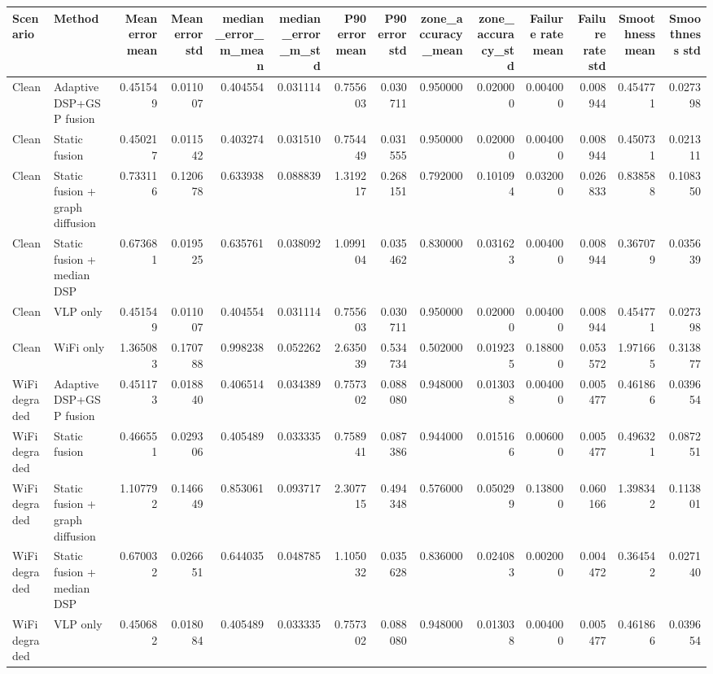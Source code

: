 \begin{tabular}{llrrrrrrrrrrrr}
\toprule
Scenario & Method & Mean error mean & Mean error std & median_error_m_mean & median_error_m_std & P90 error mean & P90 error std & zone_accuracy_mean & zone_accuracy_std & Failure rate mean & Failure rate std & Smoothness mean & Smoothness std \\
\midrule
Clean & Adaptive DSP+GSP fusion & 0.451549 & 0.011007 & 0.404554 & 0.031114 & 0.755603 & 0.030711 & 0.950000 & 0.020000 & 0.004000 & 0.008944 & 0.454771 & 0.027398 \\
Clean & Static fusion & 0.450217 & 0.011542 & 0.403274 & 0.031510 & 0.754449 & 0.031555 & 0.950000 & 0.020000 & 0.004000 & 0.008944 & 0.450731 & 0.021311 \\
Clean & Static fusion + graph diffusion & 0.733116 & 0.120678 & 0.633938 & 0.088839 & 1.319217 & 0.268151 & 0.792000 & 0.101094 & 0.032000 & 0.026833 & 0.838588 & 0.108350 \\
Clean & Static fusion + median DSP & 0.673681 & 0.019525 & 0.635761 & 0.038092 & 1.099104 & 0.035462 & 0.830000 & 0.031623 & 0.004000 & 0.008944 & 0.367079 & 0.035639 \\
Clean & VLP only & 0.451549 & 0.011007 & 0.404554 & 0.031114 & 0.755603 & 0.030711 & 0.950000 & 0.020000 & 0.004000 & 0.008944 & 0.454771 & 0.027398 \\
Clean & WiFi only & 1.365083 & 0.170788 & 0.998238 & 0.052262 & 2.635039 & 0.534734 & 0.502000 & 0.019235 & 0.188000 & 0.053572 & 1.971665 & 0.313877 \\
WiFi degraded & Adaptive DSP+GSP fusion & 0.451173 & 0.018840 & 0.406514 & 0.034389 & 0.757302 & 0.088080 & 0.948000 & 0.013038 & 0.004000 & 0.005477 & 0.461866 & 0.039654 \\
WiFi degraded & Static fusion & 0.466551 & 0.029306 & 0.405489 & 0.033335 & 0.758941 & 0.087386 & 0.944000 & 0.015166 & 0.006000 & 0.005477 & 0.496321 & 0.087251 \\
WiFi degraded & Static fusion + graph diffusion & 1.107792 & 0.146649 & 0.853061 & 0.093717 & 2.307715 & 0.494348 & 0.576000 & 0.050299 & 0.138000 & 0.060166 & 1.398342 & 0.113801 \\
WiFi degraded & Static fusion + median DSP & 0.670032 & 0.026651 & 0.644035 & 0.048785 & 1.105032 & 0.035628 & 0.836000 & 0.024083 & 0.002000 & 0.004472 & 0.364542 & 0.027140 \\
WiFi degraded & VLP only & 0.450682 & 0.018084 & 0.405489 & 0.033335 & 0.757302 & 0.088080 & 0.948000 & 0.013038 & 0.004000 & 0.005477 & 0.461866 & 0.039654 \\

\end{tabular}
